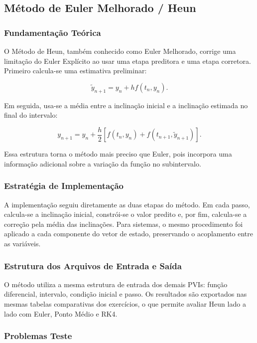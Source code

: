 \subsection{Método de Euler Melhorado / Heun}

\subsubsection{Fundamentação Teórica}

O Método de Heun, também conhecido como Euler Melhorado, corrige uma limitação do Euler Explícito ao usar uma etapa preditora e uma etapa corretora. Primeiro calcula-se uma estimativa preliminar:

\[
    \widetilde{y}_{n+1}=y_n+h f(t_n,y_n).
\]

Em seguida, usa-se a média entre a inclinação inicial e a inclinação estimada no final do intervalo:

\[
    y_{n+1}=y_n+\frac{h}{2}\left[f(t_n,y_n)+f(t_{n+1},\widetilde{y}_{n+1})\right].
\]

Essa estrutura torna o método mais preciso que Euler, pois incorpora uma informação adicional sobre a variação da função no subintervalo.

\subsubsection{Estratégia de Implementação}

A implementação seguiu diretamente as duas etapas do método. Em cada passo, calcula-se a inclinação inicial, constrói-se o valor predito e, por fim, calcula-se a correção pela média das inclinações. Para sistemas, o mesmo procedimento foi aplicado a cada componente do vetor de estado, preservando o acoplamento entre as variáveis.

\subsubsection{Estrutura dos Arquivos de Entrada e Saída}

O método utiliza a mesma estrutura de entrada dos demais PVIs: função diferencial, intervalo, condição inicial e passo. Os resultados são exportados nas mesmas tabelas comparativas dos exercícios, o que permite avaliar Heun lado a lado com Euler, Ponto Médio e RK4.

\subsubsection{Problemas Teste}


